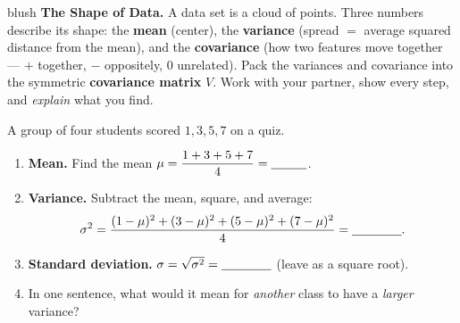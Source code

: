 \documentclass[10pt]{article}
\begin{document}
\namepartnerperiod

\vspace{0.10in}

\begin{headlinebox}{blush}
\small\textbf{The Shape of Data.} A data set is a cloud of points. Three numbers describe its shape: the
\textbf{mean} (center), the \textbf{variance} (spread $=$ average squared distance from the mean), and the
\textbf{covariance} (how two features move together --- $+$ together, $-$ oppositely, $0$ unrelated). Pack the
variances and covariance into the symmetric \textbf{covariance matrix} $V$. Work with your partner, show every
step, and \emph{explain} what you find.
\end{headlinebox}

\vspace{0.10in}

\begin{tcolorbox}[colback=white, colframe=black!40, title=\textbf{Tier R --- Remediate},
    fonttitle=\bfseries, arc=1.5mm, left=3mm, right=3mm, top=2mm, bottom=2mm, breakable]
A group of four students scored $1,3,5,7$ on a quiz.
\begin{enumerate}[leftmargin=1.7em, itemsep=8pt]
  \item \textbf{Mean.} Find the mean $\mu=\dfrac{1+3+5+7}{4}=\blank{1.0cm}$.
  \item \textbf{Variance.} Subtract the mean, square, and average:
        \[ \sigma^2=\frac{(1-\mu)^2+(3-\mu)^2+(5-\mu)^2+(7-\mu)^2}{4}=\blank{1.4cm}. \]
  \item \textbf{Standard deviation.} $\sigma=\sqrt{\sigma^2}=\blank{1.4cm}$ (leave as a square root).
  \item In one sentence, what would it mean for \emph{another} class to have a \emph{larger} variance? \writeline
\end{enumerate}
\end{tcolorbox}
\end{document}
